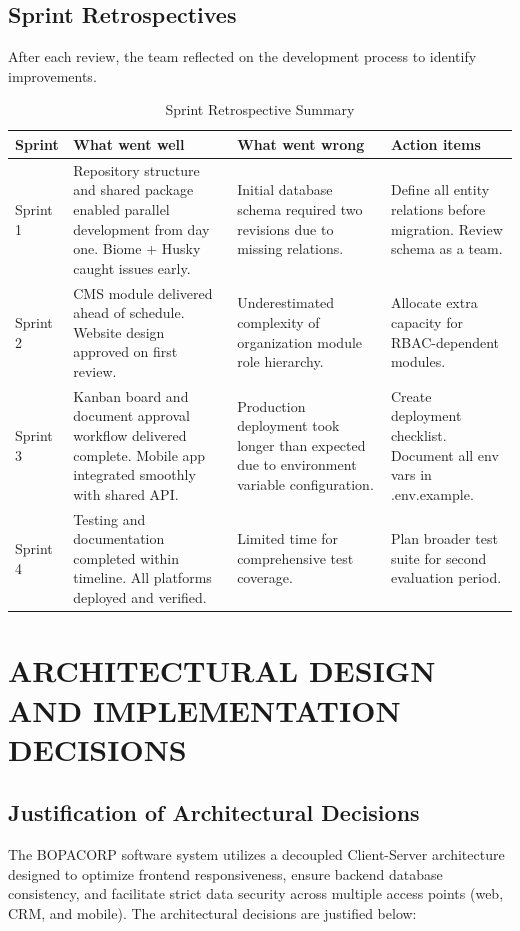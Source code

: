 \documentclass[letterpaper%
, oneside%
, 12pt%
, memoireprojet%
, english%
,creativecommons,hyperref, withAlgo2e %
]{thETS}
\begin{document}
\section{Sprint Retrospectives}
After each review, the team reflected on the development process to identify improvements.

\begin{table}[H]
\centering
\begin{tabular}{|p{1.5cm}|p{4cm}|p{4cm}|p{4cm}|}
\hline
\textbf{Sprint} & \textbf{What went well} & \textbf{What went wrong} & \textbf{Action items} \\ \hline
Sprint 1 & Repository structure and shared package enabled parallel development from day one. Biome + Husky caught issues early. & Initial database schema required two revisions due to missing relations. & Define all entity relations before migration. Review schema as a team. \\ \hline
Sprint 2 & CMS module delivered ahead of schedule. Website design approved on first review. & Underestimated complexity of organization module role hierarchy. & Allocate extra capacity for RBAC-dependent modules. \\ \hline
Sprint 3 & Kanban board and document approval workflow delivered complete. Mobile app integrated smoothly with shared API. & Production deployment took longer than expected due to environment variable configuration. & Create deployment checklist. Document all env vars in .env.example. \\ \hline
Sprint 4 & Testing and documentation completed within timeline. All platforms deployed and verified. & Limited time for comprehensive test coverage. & Plan broader test suite for second evaluation period. \\ \hline
\end{tabular}
\caption{Sprint Retrospective Summary}
\label{tab:retrospectives}
\end{table}


\chapter{ARCHITECTURAL DESIGN AND IMPLEMENTATION DECISIONS}

\section{Justification of Architectural Decisions}
The BOPACORP software system utilizes a decoupled Client-Server architecture designed to optimize frontend responsiveness, ensure backend database consistency, and facilitate strict data security across multiple access points (web, CRM, and mobile). The architectural decisions are justified below:
\end{document}
